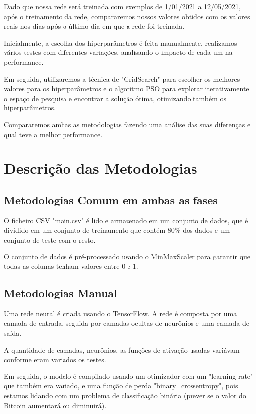 \documentclass[10pt]{article}
\begin{document}
Dado que nossa rede será treinada com exemplos de 1/01/2021 a 12/05/2021, 
após o treinamento da rede, compararemos nossos valores obtidos 
com os valores reais nos dias após o último dia em que a rede foi treinada. 

Inicialmente, a escolha dos hiperparâmetros é feita manualmente, realizamos 
vários testes com diferentes variações, analisando o impacto de cada um 
na performance. 

Em seguida, utilizaremos a técnica de "GridSearch" para escolher os melhores valores 
para os hiperparâmetros e o algoritmo PSO para explorar iterativamente o espaço de pesquisa 
e encontrar a solução ótima, otimizando também os hiperparâmetros.

Compararemos ambas as metodologias fazendo uma análise das suas diferenças
e qual teve a melhor performance.

\section{Descrição das Metodologias}\label{sec:desc-das-met}
\subsection{Metodologias Comum em ambas as fases}

O ficheiro CSV "main.csv" é lido e armazenado em um conjunto de dados, 
que é dividido em um conjunto de treinamento que contém 80\% dos dados
e um conjunto de teste com o resto.

O conjunto de dados é pré-processado usando o MinMaxScaler 
para garantir que todas as colunas tenham valores entre 0 e 1.

\subsection{Metodologias Manual}

Uma rede neural é criada usando o TensorFlow. 
A rede é composta por uma camada de entrada, 
seguida por camadas ocultas de neurônios e uma camada de saída.

A quantidade de camadas, neurônios, as funções de ativação usadas variávam
conforme eram variados os testes.

Em seguida, o modelo é compilado usando um otimizador com um "learning rate"
que também era variado, e uma função de perda "binary\_crossentropy",
pois estamos lidando com um problema de classificação binária 
(prever se o valor do Bitcoin aumentará ou diminuirá).
\end{document}

